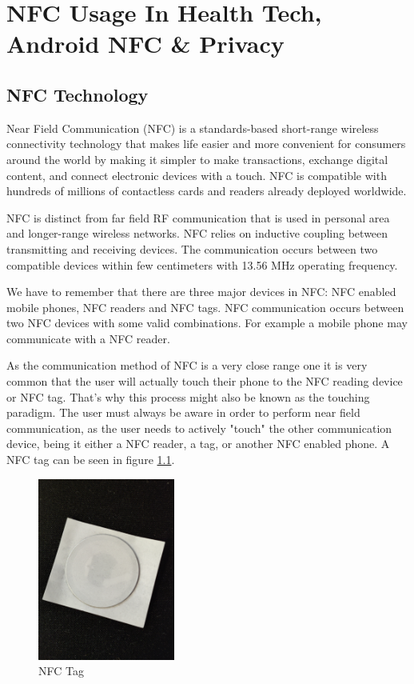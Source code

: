 \chapter{NFC Usage In Health Tech, Android NFC \& Privacy}
\label{chap:ch2}

\section{NFC Technology}
\label{sec:ch2sec1}

\par Near Field Communication (NFC) is a standards-based short-range wireless connectivity technology that makes life easier and more convenient for consumers around the world by making it simpler to make transactions, exchange digital content, and connect electronic devices with a touch. NFC is compatible with hundreds of millions of contactless cards and readers already deployed worldwide. \cite{whatIsNFC}

NFC is distinct from far field RF communication that is used in personal area and longer-range wireless networks. NFC relies on inductive coupling between transmitting and receiving devices. The communication occurs between two compatible devices within few centimeters with 13.56 MHz operating frequency. \cite{coskun2013survey}

We have to remember that there are three major devices in NFC: NFC enabled mobile phones, NFC readers and NFC tags. NFC communication occurs between two NFC devices with some valid combinations. For example a mobile phone may communicate with a NFC reader. \cite{coskun2011near}

As the communication method of NFC is a very close range one it is very common that the user will actually touch their phone to the NFC reading device or NFC tag. That's why this process might also be known as the touching paradigm. The user must always be aware in order to perform near field communication, as the user needs to actively "touch" the other communication device, being it either a NFC reader, a tag, or another NFC enabled phone. A NFC tag can be seen in figure \ref{fig:nfc-tag}.

\begin{figure}
\centering
\includegraphics[width=0.4\textwidth]{figures/nfc_tag.jpg}
\caption{NFC Tag}
\label{fig:nfc-tag}
\end{figure}

